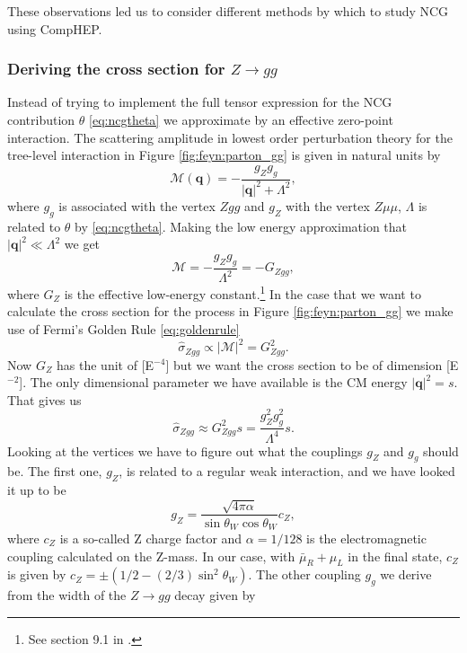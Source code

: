 These observations led us to consider different methods by which to study NCG using CompHEP.

\subsubsection{Deriving the cross section for $Z \rightarrow gg$}
Instead of trying to implement the full tensor expression for the NCG contribution $\theta$ \eqref{eq:ncgtheta} we approximate by an effective zero-point interaction. The scattering amplitude in lowest order perturbation theory for the tree-level interaction in Figure \ref{fig:feyn:parton_gg} is given in natural units by
\begin{equation}
	\mathcal{M}(\mathbf{q}) = -\frac{g_Z g_g }{|\mathbf{q}|^2 + \Lambda^2},
\end{equation}
where $g_g$ is associated with the vertex $Zgg$ and $g_Z$ with the vertex $Z\mu\mu$, $\Lambda$ is related to $\theta$ by \eqref{eq:ncgtheta}. Making the low energy approximation that $|\mathbf{q}|^2 \ll \Lambda^2$ we get
\begin{equation} \label{eq:scatteringamplitude}
	\mathcal{M} = -\frac{g_Z g_g}{\Lambda^2} = -G_{Zgg},
\end{equation}
where $G_Z$ is the effective low-energy constant.\footnote{See section 9.1 in \cite{martin1998pp}.} In the case that we want to calculate the cross section for the process in Figure \ref{fig:feyn:parton_gg} we make use of Fermi's Golden Rule \eqref{eq:goldenrule}
\begin{equation}
	\hat \sigma_{Zgg} \propto |\mathcal{M}|^2 = G_{Zgg}^2.
\end{equation}
Now $G_Z$ has the unit of [E$^{-4}$] but we want the cross section to be of dimension [E$^{-2}$]. The only dimensional parameter we have available is the CM energy $|\mathbf{q}|^2 = s$. That gives us
\begin{equation}
	\hat \sigma_{Zgg} \approx G_{Zgg}^2 s = \frac{g_Z^2 g_g^2}{\Lambda^4}s.
\end{equation}
Looking at the vertices we have to figure out what the couplings $g_Z$ and $g_g$ should be. The first one, $g_Z$, is related to a regular weak interaction, and we have looked it up to be \cite{bettini2008iep}
\begin{equation}
	g_Z = \frac{\sqrt{4\pi\alpha}}{\sin{\theta_W}\cos{\theta_W}} c_Z,
\end{equation}
where $c_Z$ is a so-called Z charge factor and $\alpha = 1/128$ is the electromagnetic coupling calculated on the Z-mass. In our case, with $\bar \mu_R + \mu_L$ in the final state, $c_Z$ is given by $c_Z = \pm (1/2 - (2/3)\sin^2{\theta_W})$. The other coupling $g_g$ we derive from the width of the $Z \rightarrow gg$ decay given by \cite{behr2003dnc}
